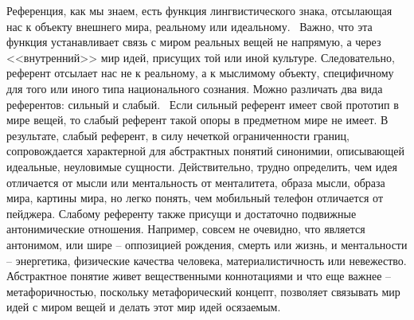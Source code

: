 Референция, как мы знаем, есть функция лингвистического знака, отсылающая нас
к объекту внешнего мира, реальному или идеальному.~\autocite{general_lingvo}
Важно, что эта функция устанавливает связь с миром реальных вещей не напрямую,
а через <<внутренний>> мир идей, присущих той или иной культуре.
Следовательно, референт отсылает нас не к реальному, а к мыслимому объекту,
специфичному для того или иного типа национального сознания. Можно различать два вида
референтов: сильный и слабый.~\autocite{golovanskaya} Если сильный референт имеет свой прототип
в мире вещей, то слабый референт такой опоры в предметном мире не имеет.
В результате, слабый референт, в силу нечеткой ограниченности границ, сопровождается
характерной для абстрактных понятий синонимии, описывающей идеальные, неуловимые сущности.
Действительно, трудно определить, чем идея отличается от мысли или ментальность от
менталитета, образа мысли, образа мира, картины мира, но легко понять, чем мобильный телефон
отличается от пейджера. Слабому референту также присущи и достаточно подвижные
антонимические отношения. Например, совсем не очевидно, что является антонимом, или шире --
оппозицией рождения, смерть или жизнь, и ментальности -- энергетика, физические качества
человека, материалистичность или невежество. Абстрактное понятие живет вещественными коннотациями
и что еще важнее -- метафоричностью, поскольку метафорический концепт, позволяет связывать мир идей
с миром вещей и делать этот мир идей осязаемым.

